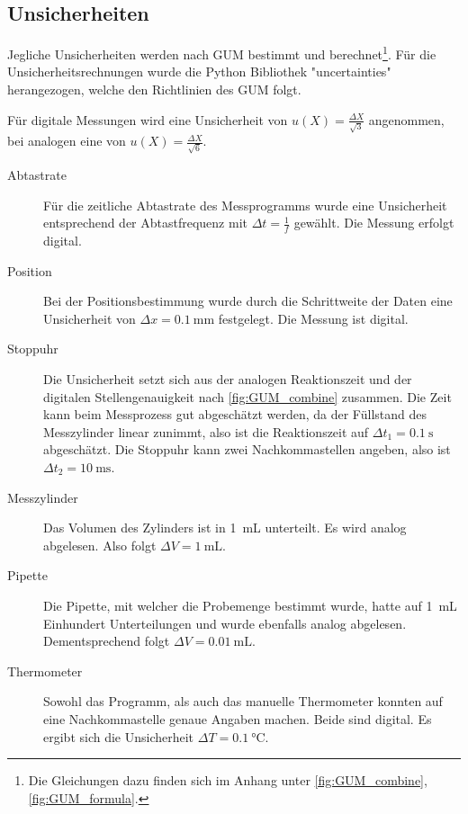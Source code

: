 	\subsection{Unsicherheiten}
	
		Jegliche Unsicherheiten werden nach GUM bestimmt und berechnet\footnote{Die Gleichungen dazu finden sich im Anhang unter \ref{fig:GUM_combine}, \ref{fig:GUM_formula}.}.
		Für die Unsicherheitsrechnungen wurde die Python Bibliothek "uncertainties" herangezogen, welche den Richtlinien des GUM folgt.
	
		Für digitale Messungen wird eine Unsicherheit von $u(X) = \frac{\Delta X}{\sqrt{3}}$ angenommen, bei analogen eine von $u(X) = \frac{\Delta X}{\sqrt{6}}$.
		
		\begin{description}
			\item[Abtastrate] Für die zeitliche Abtastrate des Messprogramms wurde eine Unsicherheit entsprechend der Abtastfrequenz mit $\Delta t = \frac{1}{f}$ gewählt.
			Die Messung erfolgt digital.
			
			\item[Position] Bei der Positionsbestimmung wurde durch die Schrittweite der Daten eine Unsicherheit von $\Delta x = \SI{0.1}{\milli\meter}$ festgelegt.
			Die Messung ist digital.
			
			\item[Stoppuhr] Die Unsicherheit setzt sich aus der analogen Reaktionszeit und der digitalen Stellengenauigkeit nach \ref{fig:GUM_combine} zusammen.
			Die Zeit kann beim Messprozess gut abgeschätzt werden, da der Füllstand des Messzylinder linear zunimmt, also ist die Reaktionszeit auf $\Delta t_1 = \SI{0.1}{\second}$ abgeschätzt.
			Die Stoppuhr kann zwei Nachkommastellen angeben, also ist $\Delta t_2 = \SI{10}{\milli\second}$.
			
			\item[Messzylinder] Das Volumen des Zylinders ist in \SI{1}{\milli\liter} unterteilt.
			Es wird analog abgelesen.
			Also folgt $\Delta V = \SI{1}{\milli\liter}$.
			
			\item[Pipette] Die Pipette, mit welcher die Probemenge bestimmt wurde, hatte auf \SI{1}{\milli\liter} Einhundert Unterteilungen und wurde ebenfalls analog abgelesen.
			Dementsprechend folgt $\Delta V = \SI{0.01}{\milli\liter}$.
			
			\item[Thermometer] Sowohl das Programm, als auch das manuelle Thermometer konnten auf eine Nachkommastelle genaue Angaben machen.
			Beide sind digital.
			Es ergibt sich die Unsicherheit $\Delta T = \SI{0.1}{\celsius}$.
		\end{description}
		
